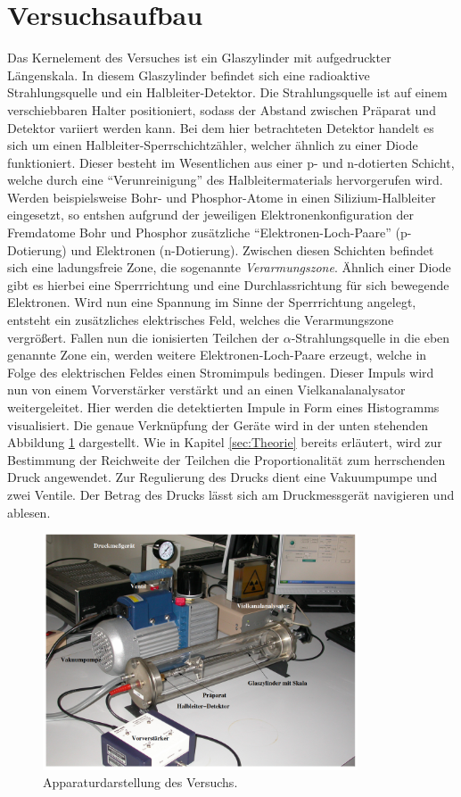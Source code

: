 


\section{Versuchsaufbau}
\label{sec:Versuchsaufbau}

Das Kernelement des Versuches ist ein Glaszylinder mit aufgedruckter Längenskala. In diesem Glaszylinder befindet 
sich eine radioaktive Strahlungsquelle und ein Halbleiter-Detektor. Die Strahlungsquelle ist auf einem verschiebbaren Halter 
positioniert, sodass der Abstand zwischen Präparat und Detektor variiert werden kann. Bei dem hier betrachteten Detektor 
handelt es sich um einen Halbleiter-Sperrschichtzähler, welcher ähnlich zu einer Diode funktioniert. Dieser besteht im 
Wesentlichen aus einer p- und n-dotierten Schicht, welche durch eine \enquote{Verunreinigung} des Halbleitermaterials 
hervorgerufen wird. Werden beispielsweise Bohr- und Phosphor-Atome in einen Silizium-Halbleiter eingesetzt, so entshen aufgrund 
der jeweiligen Elektronenkonfiguration der Fremdatome Bohr und Phosphor zusätzliche \enquote{Elektronen-Loch-Paare} (p-Dotierung)
und Elektronen (n-Dotierung). Zwischen diesen Schichten befindet sich eine ladungsfreie Zone, die sogenannte 
\emph{Verarmungszone}. Ähnlich einer Diode gibt es hierbei eine Sperrrichtung und eine Durchlassrichtung für sich bewegende Elektronen.
Wird nun eine Spannung im Sinne der Sperrrichtung angelegt, entsteht ein zusätzliches elektrisches Feld, welches die Verarmungszone 
vergrößert. Fallen nun die ionisierten Teilchen der $\alpha$-Strahlungsquelle in die eben genannte Zone ein, werden weitere
Elektronen-Loch-Paare erzeugt, welche in Folge des elektrischen Feldes einen Stromimpuls bedingen. Dieser Impuls wird nun von 
einem Vorverstärker verstärkt und an einen Vielkanalanalysator weitergeleitet. Hier werden die detektierten Impule in Form eines Histogramms visualisiert. 
Die genaue Verknüpfung der Geräte wird in der unten stehenden Abbildung \ref{fig:Aufbau} dargestellt. Wie in Kapitel \ref{sec:Theorie} bereits erläutert,
wird zur Bestimmung der Reichweite der Teilchen die Proportionalität zum herrschenden Druck angewendet. Zur Regulierung des Drucks dient eine Vakuumpumpe 
und zwei Ventile. Der Betrag des Drucks lässt sich am Druckmessgerät navigieren und ablesen.

\begin{figure}[H]
    \centering
    \includegraphics[height=7cm]{Aufbau.png}
    \caption{Apparaturdarstellung des Versuchs\cite{Versuchsanleitung_v701}.}
    \label{fig:Aufbau}
\end{figure}

